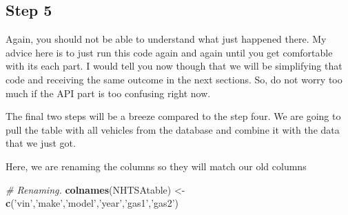 \documentclass[]{book}
\newenvironment{Shaded}{\begin{snugshade}}{\end{snugshade}}
\newcommand{\CommentTok}[1]{\textcolor[rgb]{0.56,0.35,0.01}{\textit{#1}}}
\newcommand{\ControlFlowTok}[1]{\textcolor[rgb]{0.13,0.29,0.53}{\textbf{#1}}}
\newcommand{\DataTypeTok}[1]{\textcolor[rgb]{0.13,0.29,0.53}{#1}}
\newcommand{\KeywordTok}[1]{\textcolor[rgb]{0.13,0.29,0.53}{\textbf{#1}}}
\newcommand{\NormalTok}[1]{#1}
\newcommand{\OperatorTok}[1]{\textcolor[rgb]{0.81,0.36,0.00}{\textbf{#1}}}
\newcommand{\OtherTok}[1]{\textcolor[rgb]{0.56,0.35,0.01}{#1}}
\newcommand{\StringTok}[1]{\textcolor[rgb]{0.31,0.60,0.02}{#1}}
\begin{document}
\begin{Shaded}
\end{Shaded}

\hypertarget{step-5-1}{%
\subsection{Step 5}\label{step-5-1}}

Again, you should not be able to understand what just happened there. My advice here is to just run this code again and again until you get comfortable with its each part. I would tell you now though that we will be simplifying that code and receiving the same outcome in the next sections. So, do not worry too much if the API part is too confusing right now.

The final two steps will be a breeze compared to the step four. We are going to pull the table with all vehicles from the database and combine it with the data that we just got.

Here, we are renaming the columns so they will match our old columns

\begin{Shaded}
\begin{Highlighting}[]
\CommentTok{# Renaming.}
\KeywordTok{colnames}\NormalTok{(NHTSAtable) <-}\StringTok{ }\KeywordTok{c}\NormalTok{(}\StringTok{'vin'}\NormalTok{,}\StringTok{'make'}\NormalTok{,}\StringTok{'model'}\NormalTok{,}\StringTok{'year'}\NormalTok{,}\StringTok{'gas1'}\NormalTok{,}\StringTok{'gas2'}\NormalTok{)}
\end{Highlighting}
\end{Shaded}
\end{document}
